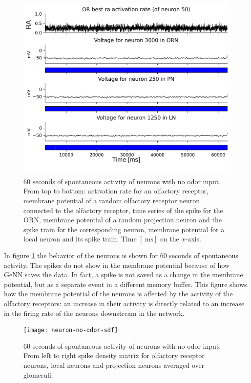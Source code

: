   \begin{figure}
    \centering
    \includegraphics[width=\textwidth]{neuron-no-odor}
    \caption{$60$ seconds of spontaneous activity of neurons with no odor input. From top to bottom: activation rate for an olfactory receptor, membrane potential of a random olfactory receptor neuron connected to the olfactory receptor, time series of the spike for the ORN, membrane potential of a random projection neuron and the spike train for the corresponding neuron, membrane potential for a local neuron and its spike train. Time $[\SI{}{\milli\second}]$ on the $x$-axis.}
    \label{fig:neuron-no-odor}
  \end{figure}

  In figure \ref{fig:neuron-no-odor} the behavior of the neurons is shown for $60$ seconds of spontaneous activity.
  The spikes do not show in the membrane potential because of how GeNN saves the data.
  In fact, a spike is not saved as a change in the membrane potential, but as a separate event in a different memory buffer.
  This figure shows how the membrane potential of the neurons is affected by the activity of the olfactory receptors: an increase in their activity is directly related to an increase in the firing rate of the neurons downstream in the network.\\

  \begin{figure}
    \centering
    \texttt{[image: neuron-no-odor-sdf]}
    \caption{$60$ seconds of spontaneous activity of neurons with no odor input. From left to right spike density matrix for olfactory receptor neurons, local neurons and projection neurons averaged over glomeruli.}
    \label{fig:neuron-no-odor-sdf}
  \end{figure}

